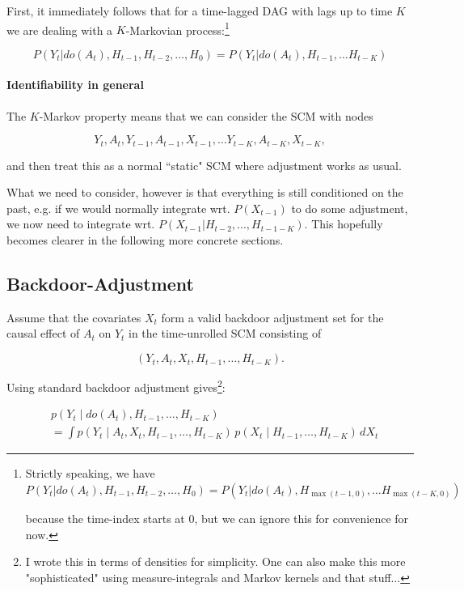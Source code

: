 \documentclass[11pt]{article}
\theoremstyle{definition}
\theoremstyle{remark}
\begin{document}
First, it immediately follows that for a time-lagged DAG with lags up to time $K$ we are dealing with a $K$-Markovian process:\footnote{Strictly speaking, we have $P(Y_t| do(A_t), H_{t-1}, H_{t-2}, \ldots, H_0) = P(Y_t| do(A_t), H_{\max(t-1,0)}, \ldots H_{\max(t-K,0)})$

because the time-index starts at $0$, but we can ignore this for convenience for now.} 

\begin{equation}
    P(Y_t| do(A_t), H_{t-1}, H_{t-2}, \ldots, H_0) = P(Y_t| do(A_t), H_{t-1}, \ldots H_{t-K})
\end{equation}

\paragraph{Identifiability in general}

The $K$-Markov property means that we can consider the SCM with nodes

$$Y_t, A_t, Y_{t-1}, A_{t-1}, X_{t-1}, \ldots Y_{t-K}, A_{t-K}, X_{t-K},$$

and then treat this as a normal ``static" SCM where adjustment works as usual.

What we need to consider, however is that everything is still conditioned on the past, e.g. if we would normally integrate wrt. $P(X_{t-1})$ to do some adjustment, we now need to integrate wrt. $P(X_{t-1}|H_{t-2}, ..., H_{t-1-K})$. This hopefully becomes clearer in the following more concrete sections. 



\subsection{Backdoor-Adjustment}

Assume that the covariates $X_t$ form a valid backdoor adjustment set for the causal effect of $A_t$ on $Y_t$ in the time-unrolled SCM consisting of

\[
(Y_t, A_t, X_t, H_{t-1}, \dots, H_{t-K}).
\]

Using standard backdoor adjustment gives\footnote{I wrote this in terms of densities for simplicity. One can also make this more "sophisticated" using measure-integrals and Markov kernels and that stuff...}:

\begin{equation}
\begin{aligned}
&p(Y_t \mid do(A_t), H_{t-1},\dots,H_{t-K}) \\
&=
\int
p(Y_t \mid A_t, X_t, H_{t-1},\dots,H_{t-K}) \, p(X_t \mid H_{t-1},\dots,H_{t-K})
\, dX_t
\end{aligned}
\end{equation}
\end{document}
